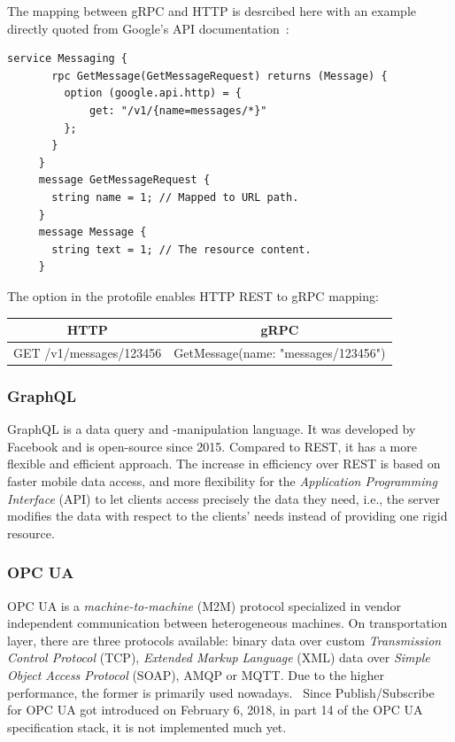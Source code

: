 The mapping between gRPC and HTTP is desrcibed here with an example directly quoted from Google's API documentation~\cite{Google-API-Documentation2019Http.proto.2019}:\\

\begin{lstlisting}[language=protobuf3,style=protobuf]
     service Messaging {
       rpc GetMessage(GetMessageRequest) returns (Message) {
         option (google.api.http) = {
             get: "/v1/{name=messages/*}"
         };
       }
     }
     message GetMessageRequest {
       string name = 1; // Mapped to URL path.
     }
     message Message {
       string text = 1; // The resource content.
     }
\end{lstlisting}

The option in the protofile enables HTTP REST to gRPC mapping:

    \begin{tabular}{c|c}
        \textbf{HTTP} & \textbf{gRPC} \\ \hline
        GET /v1/messages/123456 & GetMessage(name: "messages/123456")
    \end{tabular}


\subsubsection{GraphQL}
GraphQL is a data query and -manipulation language. It was developed by Facebook and is open-source since 2015. Compared to REST, it has a more flexible and efficient approach. The increase in efficiency over REST is based on faster mobile data access, and more flexibility for the \textit{Application Programming Interface} (API) to let clients access precisely the data they need, i.e., the server modifies the data with respect to the clients' needs instead of providing one rigid resource.~\cite{GraphQL-Documentation2018Basics2018} 

\subsubsection{OPC UA}
OPC UA is a \textit{machine-to-machine} (M2M) protocol specialized in vendor independent communication between heterogeneous machines. On transportation layer, there are three protocols available: binary data over custom \textit{Transmission Control Protocol} (TCP), \textit{Extended Markup Language} (XML) data over \textit{Simple Object Access Protocol} (SOAP), AMQP or MQTT. Due to the higher performance, the former is primarily used nowadays.~\cite{Schleipen2016OPCVariability} Since Publish/Subscribe for OPC UA got introduced on February 6, 2018, in part 14 of the OPC UA specification stack, it is not implemented much yet.

